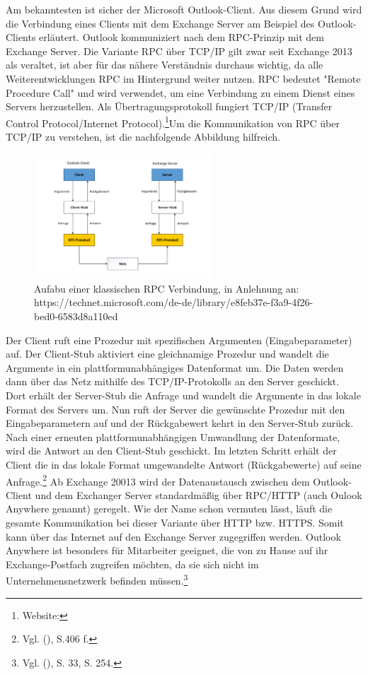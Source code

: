 Am bekanntesten ist sicher der Microsoft Outlook-Client. Aus diesem Grund wird die Verbindung eines Clients mit dem Exchange Server am Beispiel des Outlook-Clients erläutert. Outlook kommuniziert nach dem RPC-Prinzip mit dem Exchange Server. Die Variante RPC über TCP/IP  gilt zwar seit Exchange 2013 als veraltet, ist aber für das nähere Verständnis durchaus wichtig, da alle Weiterentwicklungen RPC im Hintergrund weiter nutzen. RPC bedeutet "Remote Procedure Call" und wird verwendet, um eine Verbindung zu einem Dienst eines Servers herzustellen. Als Übertragungsprotokoll fungiert TCP/IP (Transfer Control Protocol/Internet Protocol).\footnote{Website:\cite{MSXrpc}}Um die Kommunikation von RPC über TCP/IP zu verstehen, ist die nachfolgende Abbildung hilfreich.

\begin{figure}[h!]
\centering
	\includegraphics[width=0.59\textwidth]{Abbildungen/RPC_TCP.pdf}
	\caption[Aufbau einer klassischen RPC Verbindung]{Aufabu einer klassischen RPC Verbindung,    in Anlehnung an:\\https://technet.microsoft.com/de-de/library/e8feb37e-f3a9-4f26-bed0-6583d8a110ed}
	\label{fig:RPC_TCP}
\end{figure}

\noindent 
Der Client ruft eine Prozedur mit spezifischen Argumenten (Eingabeparameter) auf. Der Client-Stub aktiviert eine gleichnamige Prozedur und wandelt die Argumente in ein plattformunabhängiges Datenformat um. Die Daten werden dann über das Netz mithilfe des TCP/IP-Protokolls an den Server geschickt. Dort erhält der Server-Stub die Anfrage und wandelt die Argumente in das lokale Format des Servers um. Nun ruft der Server die gewünschte Prozedur mit den Eingabeparametern auf und der Rückgabewert kehrt in den Server-Stub zurück. Nach einer erneuten plattformunabhängigen Umwandlung der Datenformate, wird die Antwort an den Client-Stub geschickt. Im letzten Schritt erhält der Client die in das lokale Format umgewandelte Antwort (Rückgabewerte) auf seine Anfrage.\footnote{Vgl. \citeauthor{Schneider} (\citeyear{Schneider}), S.406 f.}\newline
Ab Exchange 20013 wird der Datenaustausch zwischen dem Outlook-Client und dem Exchanger Server standardmäßig über RPC/HTTP (auch Oulook Anywhere genannt) geregelt. Wie der Name schon vermuten lässt, läuft die gesamte Kommunikation bei dieser Variante über HTTP bzw. HTTPS. Somit kann über das Internet auf den Exchange Server zugegriffen werden. Outlook Anywhere ist besonders für Mitarbeiter geeignet, die von zu Hause auf ihr Exchange-Postfach zugreifen möchten, da sie sich nicht im Unternehmensnetzwerk befinden müssen.\footnote{Vgl. \citeauthor{Joos} (\citeyear{Joos}), S. 33, S. 254.}

